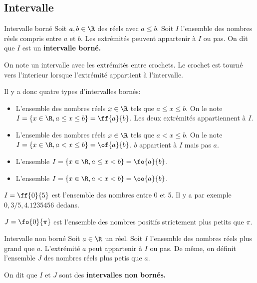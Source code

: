 \subsection{Intervalle}
\begin{defi}{Intervalle borné}{}
	Soit $a, b\in\R$ des réels avec $a\le b$. Soit $I$ l'ensemble des nombres réels compris entre $a$ et $b$. Les extrémités peuvent appartenir à $I$ ou pas. On dit que $I$ est un \bf{intervalle borné}.
\end{defi}

\begin{notation}{}{}
	On note un intervalle avec les extrémités entre crochets. Le crochet est tourné vers l'interieur lorsque l'extrémité appartient à l'intervalle.
\end{notation}

\begin{ex}{}{}
	Il y a donc quatre types d'intervalles bornés:
		\begin{itemize}
			\item L'ensemble des nombres réels $x\in\R$ tels que $a\le x\le b$. On le note $I = \{x\in\R, a\le x\le b\} = \ff{a}{b}$. Les deux extrémités appartiennent à $I$.
			\item  L'ensemble des nombres réels $x\in\R$ tels que $a<x\le b$. On le note $I = \{x\in\R, a< x\le b\}= \of{a}{b}$. $b$ appartient à $I$ mais pas $a$.
			\item L'ensemble $I = \{x\in\R, a\le x< b\}= \fo{a}{b}$.
			\item L'ensemble $I = \{x\in\R, a< x< b\}= \oo{a}{b}$.
		\end{itemize}
\end{ex}

\begin{ex}{}{}
	$I = \ff{0}{5}$ est l'ensemble des nombres entre 0 et 5. Il y a par exemple $0, 3/5, 4.1235456$ dedans.


	$J =\fo{0}{\pi}$ est l'ensemble des nombres positifs strictement plus petits que $\pi$. 
\end{ex}


\begin{defi}{Intervalle non borné}{}
	Soit $a\in\R$ un réel. Soit $I$ l'ensemble des nombres réels plus grand que $a$. L'extrémité $a$ peut appartenir à $I$ ou pas. De même, on définit l'ensemble $J$ des nombres réels plus petis que $a$.
	
	On dit que $I$ et $J$ sont des \bf{intervalles non bornés}.
\end{defi}


